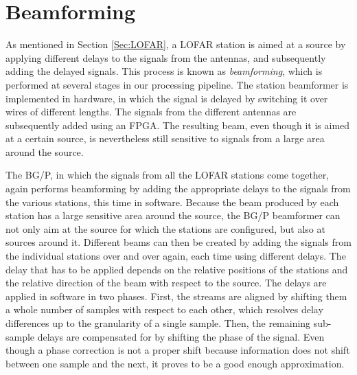\documentclass{llncs}
\begin{document}

\section{Beamforming}
\label{Sec:Beamforming}

As mentioned in Section \ref{Sec:LOFAR}, a LOFAR station is aimed at a source by applying different delays to the signals from the antennas, and subsequently adding the delayed signals. This process is known as \emph{beamforming}, which is performed at several stages in our processing pipeline. The station beamformer is implemented in hardware, in which the signal is delayed by switching it over wires of different lengths. The signals from the different antennas are subsequently added using an FPGA. The resulting beam, even though it is aimed at a certain source, is nevertheless still sensitive to signals from a large area around the source.

The BG/P, in which the signals from all the LOFAR stations come together, again performs beamforming by adding the appropriate delays to the signals from the various stations, this time in software. Because the beam produced by each station has a large sensitive area around the source, the BG/P beamformer can not only aim at the source for which the stations are configured, but also at sources around it. Different beams can then be created by adding the signals from the individual stations over and over again, each time using different delays. The delay that has to be applied depends on the relative positions of the stations and the relative direction of the beam with respect to the source. The delays are applied in software in two phases. First, the streams are aligned by shifting them a whole number of samples with respect to each other, which resolves delay differences up to the granularity of a single sample. Then, the remaining sub-sample delays are compensated for by shifting the phase of the signal. Even though a phase correction is not a proper shift because information does not shift between one sample and the next, it proves to be a good enough approximation.
\end{document}
